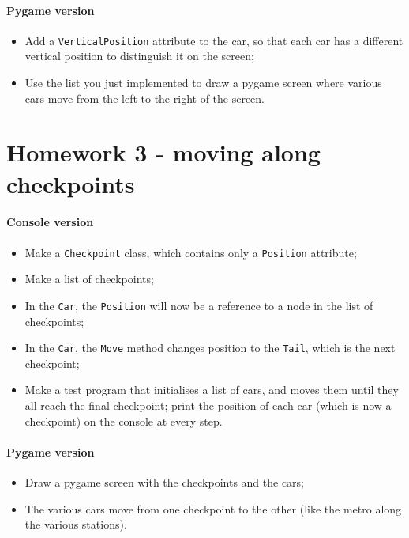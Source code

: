 \documentclass[12pt,a4paper,draft]{article}
\begin{document}
		\paragraph*{Pygame version}
			\begin{itemize}
				\item Add a \texttt{VerticalPosition} attribute to the car, so that each car has a different vertical position to distinguish it on the screen;
				\item Use the list you just implemented to draw a pygame screen where various cars move from the left to the right of the screen.
			\end{itemize}

	\section{Homework 3 - moving along checkpoints}
		\paragraph*{Console version}
			\begin{itemize}
				\item Make a \texttt{Checkpoint} class, which contains only a \texttt{Position} attribute;
				\item Make a list of checkpoints;
				\item In the \texttt{Car}, the \texttt{Position} will now be a reference to a node in the list of checkpoints;
				\item In the \texttt{Car}, the \texttt{Move} method changes position to the \texttt{Tail}, which is the next checkpoint;
				\item Make a test program that initialises a list of cars, and moves them until they all reach the final checkpoint; print the position of each car (which is now a checkpoint) on the console at every step.
			\end{itemize}
		
		\paragraph*{Pygame version}
			\begin{itemize}
				\item Draw a pygame screen with the checkpoints and the cars;
				\item The various cars move from one checkpoint to the other (like the metro along the various stations).
			\end{itemize}
\end{document}
